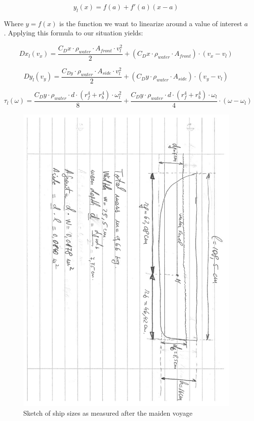 \[ y_{l}(x) = f(a) + f'(a)(x-a) \]

Where $y = f(x)$ is the function we want to linearize around a value of interest $a$. Applying this formula to our situation yields:

\[ Dx_{l}(v_{x}) = \frac{C_{D}x\cdot\rho_{water}\cdot A_{front}\cdot v_{l}^{2}}{2} + (C_{D}x\cdot\rho_{water}\cdot A_{front})\cdot (v_{x}-v_{l}) \]

\[ Dy_{l}(v_{y}) = \frac{C_{Dy}\cdot\rho_{water}\cdot A_{side}\cdot v_{l}^{2}}{2} + (C_{D}y\cdot\rho_{water}\cdot A_{side})\cdot (v_{y}-v_{l}) \]

\[ \tau_{l}(\omega) = \frac{C_{D}y \cdot \rho_{water} \cdot d \cdot (r_{f}^{4} + r_{b}^{4}) \cdot \omega_{l}^{2}}{8} + \frac{C_{D}y \cdot \rho_{water} \cdot d \cdot (r_{f}^{4} + r_{b}^{4}) \cdot \omega_{l}}{4} \cdot (\omega - \omega_{l}) \] 

\begin{figure}[htbp]
	\centering
	\includegraphics[width=\textwidth, trim=1.8cm 0cm 0cm 2cm, clip = true, angle = 90, width=\textwidth]{img/ship_sizes}
	\caption{Sketch of ship sizes as measured after the maiden voyage}
	\label{fig:ship_sizes}
\end{figure}

